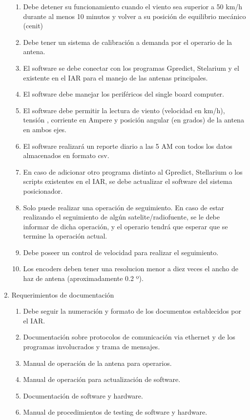 \documentclass[11pt, %
codirector, %
]{charter}
\begin{document}
\begin{enumerate}
\begin{enumerate}
			\item Debe detener su funcionamiento cuando el viento sea superior a 50 km/h durante al menos 10 minutos y volver a su posición de equilibrio mecánico (cenit) 
			\item Debe tener un sistema de calibración a demanda por el operario de la antena. 
			\item El software se debe conectar con los programas Gpredict, Stelarium y el existente en el IAR para el manejo de las antenas principales. 
			\item El software debe manejar los periféricos del single board computer. 
			\item El software debe permitir la lectura de viento (velocidad en km/h), tensión , corriente en Ampere y posición angular (en grados) de la antena en ambos ejes. 
			\item El software realizará un reporte diario a las 5 AM con todos los datos almacenados en formato csv.  
			\item En caso de adicionar otro programa distinto al Gpredict, Stellarium o los scripts existentes en el IAR, se debe actualizar el software del sistema posicionador. 
			\item Solo puede realizar una operación de seguimiento. En caso de estar realizando el seguimiento de algún satelite/radiofuente, se le debe informar de dicha operación, y el operario tendrá que esperar que se termine la operación actual.  
			\item Debe poseer un control de velocidad para realizar el seguimiento.
			\item Los encoders deben tener una resolucion menor a diez veces el ancho de haz de antena (aproximadamente 0.2 º).
		\end{enumerate}
	\item Requerimientos de documentación
		\begin{enumerate}
			\item Debe seguir la numeración y formato de los documentos establecidos por el IAR. 
			\item Documentación sobre protocolos de comunicación via ethernet y de los programas involucrados y trama de mensajes.
			\item Manual de operación de la antena para operarios. 
			\item Manual de operación para actualización de software. 
			\item Documentación de software y hardware. 
			\item Manual de procedimientos de testing de software y hardware.	

\end{enumerate}
\end{enumerate}
\end{document}
